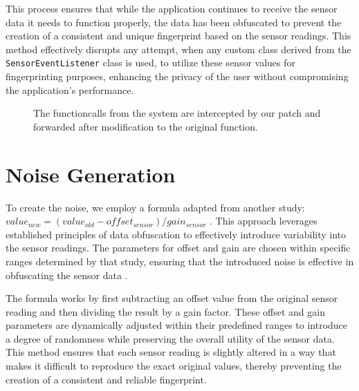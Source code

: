 \documentclass[11pt,
  oneside,openany,    %
]{scrreprt}
\begin{document}
This process ensures that while the application continues to receive the sensor data it needs to function properly, the data has been obfuscated to prevent the creation of a consistent and unique fingerprint based on the sensor readings.
This method effectively disrupts any attempt, when any custom class derived from the \verb|SensorEventListener| class is used, to utilize these sensor values for fingerprinting purposes, enhancing the privacy of the user without compromising the application's performance.

\begin{figure}[h]
  \centering
  \captionsetup{justification=centering}
  \caption{The functioncalls from the system are intercepted by our patch and forwarded after modification to the original function.}
  \label{fig:patch}
\end{figure}

\section{Noise Generation}
\label{sec:noise_gen}
To create the noise, we employ a formula adapted from another study: $value_{new} = (value_{old} - offset_{sensor}) / gain_{sensor}$ \cite{das2016tracking}.
This approach leverages established principles of data obfuscation to effectively introduce variability into the sensor readings.
The parameters for offset and gain are chosen within specific ranges determined by that study, ensuring that the introduced noise is effective in obfuscating the sensor data \cite{das2016tracking}.

The formula works by first subtracting an offset value from the original sensor reading and then dividing the result by a gain factor.
These offset and gain parameters are dynamically adjusted within their predefined ranges to introduce a degree of randomness while preserving the overall utility of the sensor data.
This method ensures that each sensor reading is slightly altered in a way that makes it difficult to reproduce the exact original values, thereby preventing the creation of a consistent and reliable fingerprint.
\end{document}
